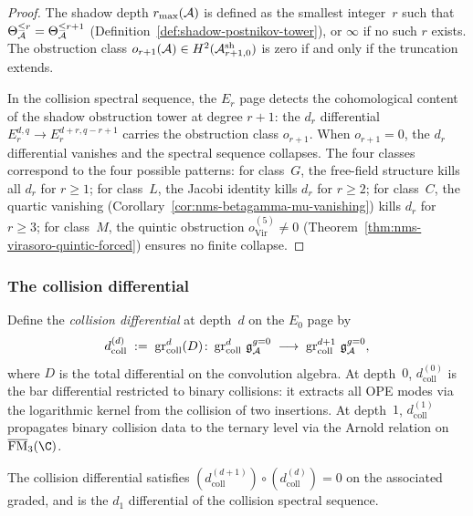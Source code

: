 \begin{proof}
The shadow depth $r_{\max}(\mathcal{A})$ is defined as the smallest integer~$r$
such that $\Theta_{\mathcal{A}}^{\leq r} = \Theta_{\mathcal{A}}^{\leq r+1}$
(Definition~\ref{def:shadow-postnikov-tower}), or $\infty$ if no such
$r$ exists. The obstruction class
$o_{r+1}(\mathcal{A}) \in H^2(\mathcal{A}^{\mathrm{sh}}_{r+1,0})$ is zero if and
only if the truncation extends.

In the collision spectral sequence, the $E_r$ page detects the
cohomological content of the shadow obstruction tower at degree $r+1$:
the $d_r$ differential $E_r^{d,q} \to E_r^{d+r,q-r+1}$
carries the obstruction class $o_{r+1}$. When $o_{r+1} = 0$,
the $d_r$ differential vanishes and the spectral sequence collapses.
The four classes correspond to the four possible patterns:
for class~$G$, the free-field structure kills all $d_r$ for
$r \geq 1$; for class~$L$, the Jacobi identity kills $d_r$
for $r \geq 2$; for class~$C$, the quartic vanishing
(Corollary~\ref{cor:nms-betagamma-mu-vanishing}) kills $d_r$ for
$r \geq 3$; for class~$M$, the quintic obstruction
$o^{(5)}_{\mathrm{Vir}} \neq 0$
(Theorem~\ref{thm:nms-virasoro-quintic-forced}) ensures
no finite collapse.
\end{proof}


\subsubsection{The collision differential}

\begin{definition}
\label{def:thqg-V-collision-differential}
Define the \emph{collision differential} at depth~$d$ on the
$E_0$ page by
\begin{equation}\label{eq:thqg-V-collision-diff}
d_{\mathrm{coll}}^{(d)}
\;:=\;
\operatorname{gr}_{\mathrm{coll}}^d(D)\colon
\operatorname{gr}_{\mathrm{coll}}^d\,\mathfrak{g}^{g{=}0}_{\mathcal{A}}
\;\longrightarrow\;
\operatorname{gr}_{\mathrm{coll}}^{d+1}\,\mathfrak{g}^{g{=}0}_{\mathcal{A}},
\end{equation}
where $D$ is the total differential on the convolution algebra.
At depth~$0$, $d_{\mathrm{coll}}^{(0)}$ is the bar differential
restricted to binary collisions: it extracts all OPE modes via
the logarithmic kernel from the collision of two insertions.
At depth~$1$, $d_{\mathrm{coll}}^{(1)}$ propagates binary collision
data to the ternary level via the Arnold relation on
$\FM_3(\C)$.
\end{definition}

\begin{lemma}
\label{lem:thqg-V-collision-nilpotent}
The collision differential satisfies
$(d_{\mathrm{coll}}^{(d+1)}) \circ (d_{\mathrm{coll}}^{(d)}) = 0$
on the associated graded, and is the $d_1$ differential of the
collision spectral sequence.
\end{lemma}

